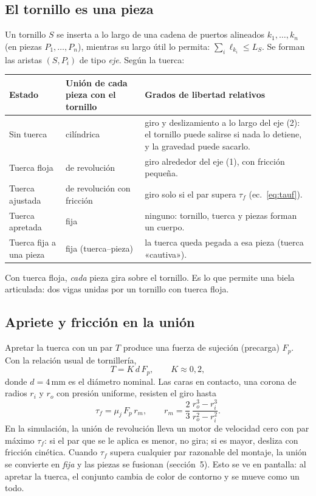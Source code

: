 \documentclass[11pt,a4paper]{article}
\numberwithin{equation}{section}
\begin{document}
\subsection{El tornillo es una pieza}
Un tornillo $S$ se inserta a lo largo de una cadena de puertos alineados $k_1,\dots,k_n$ (en piezas
$P_1,\dots,P_n$), mientras su largo útil lo permita: $\sum_i \ell_{k_i} \le L_S$. Se forman las aristas
$(S,P_i)$ de tipo \emph{eje}. Según la tuerca:

\begin{tabularx}{\linewidth}{@{}l l Y@{}}
\toprule
\textbf{Estado} & \textbf{Unión de cada pieza con el tornillo} & \textbf{Grados de libertad relativos}\\
\midrule
Sin tuerca & cilíndrica & giro y deslizamiento a lo largo del eje (2): el tornillo puede salirse si nada lo
  detiene, y la gravedad puede sacarlo.\\
Tuerca floja & de revolución & giro alrededor del eje (1), con fricción pequeña.\\
Tuerca ajustada & de revolución con fricción & giro solo si el par supera $\tau_f$ (ec.~\ref{eq:tauf}).\\
Tuerca apretada & fija & ninguno: tornillo, tuerca y piezas forman un cuerpo.\\
Tuerca fija a una pieza & fija (tuerca–pieza) & la tuerca queda pegada a esa pieza (tuerca «cautiva»).\\
\bottomrule
\end{tabularx}

\medskip
Con tuerca floja, \emph{cada} pieza gira sobre el tornillo. Es lo que permite una biela articulada: dos vigas unidas
por un tornillo con tuerca floja.

\subsection{Apriete y fricción en la unión}
Apretar la tuerca con un par $T$ produce una fuerza de sujeción (precarga) $F_p$. Con la relación usual de
tornillería,
\begin{equation}
  T = K\, d\, F_p, \qquad K \approx 0{,}2,
\end{equation}
donde $d = 4$\,mm es el diámetro nominal. Las caras en contacto, una corona de radios $r_i$ y $r_o$ con presión
uniforme, resisten el giro hasta
\begin{equation}
  \tau_f = \mu_j\, F_p\, r_m, \qquad\label{eq:tauf} r_m = \frac{2}{3}\,\frac{r_o^3 - r_i^3}{r_o^2 - r_i^2}.
\end{equation}
En la simulación, la unión de revolución lleva un motor de velocidad cero con par máximo $\tau_f$: si el par que se le
aplica es menor, no gira; si es mayor, desliza con fricción cinética. Cuando $\tau_f$ supera cualquier par razonable
del montaje, la unión se convierte en \emph{fija} y las piezas se fusionan (sección~5). Esto se ve en pantalla: al
apretar la tuerca, el conjunto cambia de color de contorno y se mueve como un todo.
\end{document}
